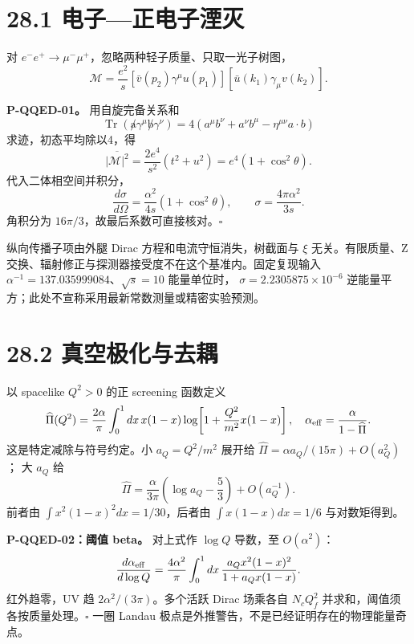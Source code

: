 \documentclass[
  11pt,
  oneside]{book}
\begin{document}
\hypertarget{ux7535ux5b50ux6b63ux7535ux5b50ux6e6eux706d}{%
\section{28.1
电子---正电子湮灭}\label{ux7535ux5b50ux6b63ux7535ux5b50ux6e6eux706d}}

对 \(e^-e^+\to\mu^-\mu^+\)，忽略两种轻子质量、只取一光子树图， \[
\mathcal M=\frac{e^2}{s}
[\bar v(p_2)\gamma^\mu u(p_1)]
[\bar u(k_1)\gamma_\mu v(k_2)].
\] \protect\hypertarget{p-qqed-01}{}{}

\textbf{P-QQED-01。} 用自旋完备关系和 \[
\operatorname{Tr}(\not a\gamma^\mu\not b\gamma^\nu)
=4(a^\mu b^\nu+a^\nu b^\mu-\eta^{\mu\nu}a\cdot b)
\] 求迹，初态平均除以4，得 \[
\overline{|\mathcal M|^2}=\frac{2e^4}{s^2}(t^2+u^2)
=e^4(1+\cos^2\theta).
\] 代入二体相空间并积分， \[
\frac{d\sigma}{d\Omega}=\frac{\alpha^2}{4s}(1+\cos^2\theta),
\qquad \sigma=\frac{4\pi\alpha^2}{3s}.
\] 角积分为 \(16\pi/3\)，故最后系数可直接核对。\(\square\)

纵向传播子项由外腿 Dirac 方程和电流守恒消失，树截面与 \(\xi\)
无关。有限质量、Z
交换、辐射修正与探测器接受度不在这个基准内。固定复现输入
\(\alpha^{-1}=137.035999084\)、\(\sqrt s=10\) 能量单位时，
\(\sigma=2.2305875\times10^{-6}\)
逆能量平方；此处不宣称采用最新常数测量或精密实验预测。

\hypertarget{ux771fux7a7aux6781ux5316ux4e0eux53bbux8026}{%
\section{28.2
真空极化与去耦}\label{ux771fux7a7aux6781ux5316ux4e0eux53bbux8026}}

以 spacelike \(Q^2>0\) 的正 screening 函数定义 \[
\widehat\Pi(Q^2)=\frac{2\alpha}{\pi}\int_0^1dx\,x(1-x)
\log\!\left[1+\frac{Q^2}{m^2}x(1-x)\right],\quad
\alpha_{\rm eff}=\frac{\alpha}{1-\widehat\Pi}.
\] 这是特定减除与符号约定。小 \(a_Q=Q^2/m^2\) 展开给
\(\widehat\Pi=\alpha a_Q/(15\pi)+O(a_Q^2)\)； 大 \(a_Q\) 给 \[
\widehat\Pi=\frac{\alpha}{3\pi}\left(\log a_Q-\frac53\right)+O(a_Q^{-1}).
\] 前者由 \(\int x^2(1-x)^2dx=1/30\)，后者由 \(\int x(1-x)dx=1/6\)
与对数矩得到。

\protect\hypertarget{p-qqed-02}{}{}

\textbf{P-QQED-02：阈值 beta。} 对上式作 \(\log Q\) 导数，至
\(O(\alpha^2)\)： \[
\frac{d\alpha_{\rm eff}}{d\log Q}
=\frac{4\alpha^2}{\pi}\int_0^1dx\,
\frac{a_Qx^2(1-x)^2}{1+a_Qx(1-x)}.
\] 红外趋零，UV 趋 \(2\alpha^2/(3\pi)\)。多个活跃 Dirac 场乘各自
\(N_cQ_f^2\) 并求和，阈值须各按质量处理。\(\square\) 一圈 Landau
极点是外推警告，不是已经证明存在的物理能量奇点。
\end{document}
